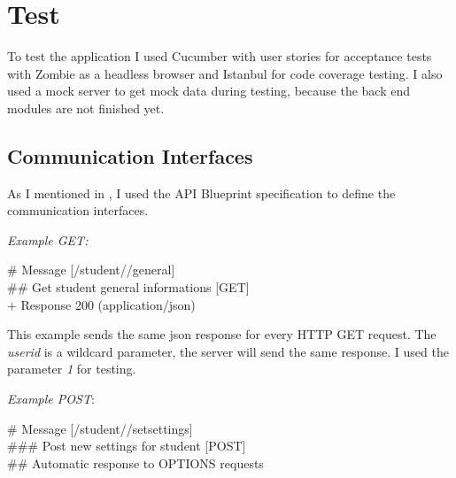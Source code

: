 \chapter{Test}
\label{7-test}

To test the application I used Cucumber with user stories for acceptance tests with Zombie as a headless browser and Istanbul for code coverage testing. I also used a mock server to get mock data during testing, because the back end modules are not finished yet.

\section{Communication Interfaces}
As I mentioned in , I used the API Blueprint specification to define the communication interfaces. 

\emph{Example GET:}

\# Message {[}/student//general{]}\\
\#\# Get student general informations [GET]\\
$+$ Response 200 (application/json)
\begin{addmargin}[1em]{1em}
\end{addmargin}

This example sends the same json response for every HTTP GET request. The \emph{userid} is a wildcard parameter, the server will send the same response. I used the parameter \emph{1} for testing.
	
	
\emph{Example POST}:

\# Message {[}/student//setsettings{]}\\
\#\#\# Post new settings for student {[}POST{]}\\
\#\# Automatic response to OPTIONS requests

